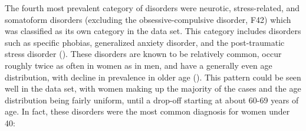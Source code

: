 \documentclass[
  openany]{book}
\newenvironment{Shaded}{\begin{snugshade}}{\end{snugshade}}
\newcommand{\AttributeTok}[1]{\textcolor[rgb]{0.13,0.29,0.53}{#1}}
\newcommand{\ConstantTok}[1]{\textcolor[rgb]{0.56,0.35,0.01}{#1}}
\newcommand{\DecValTok}[1]{\textcolor[rgb]{0.00,0.00,0.81}{#1}}
\newcommand{\FunctionTok}[1]{\textcolor[rgb]{0.13,0.29,0.53}{\textbf{#1}}}
\newcommand{\NormalTok}[1]{#1}
\newcommand{\OtherTok}[1]{\textcolor[rgb]{0.56,0.35,0.01}{#1}}
\newcommand{\SpecialCharTok}[1]{\textcolor[rgb]{0.81,0.36,0.00}{\textbf{#1}}}
\newcommand{\StringTok}[1]{\textcolor[rgb]{0.31,0.60,0.02}{#1}}
\theoremstyle{definition}
\theoremstyle{definition}
\theoremstyle{definition}
\theoremstyle{definition}
\theoremstyle{remark}
\begin{document}
The fourth most prevalent category of disorders were neurotic, stress-related, and somatoform disorders (excluding the obsessive-compulsive disorder, F42) which was classified as its own category in the data set. This category includes disorders such as specific phobias, generalized anxiety disorder, and the post-traumatic stress disorder (). These disorders are known to be relatively common, occur roughly twice as often in women as in men, and have a generally even age distribution, with decline in prevalence in older age (). This pattern could be seen well in the data set, with women making up the majority of the cases and the age distribution being fairly uniform, until a drop-off starting at about 60-69 years of age. In fact, these disorders were the most common diagnosis for women under 40:

\begin{Shaded}
\end{Shaded}
\end{document}
